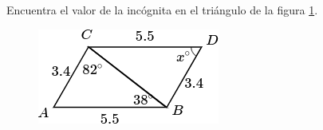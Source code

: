 Encuentra el valor de la incógnita en el triángulo de la figura \ref{fig:angle_triangle_23}.

\begin{minipage}[t][5cm][b]{0.3\textwidth}
    \begin{figure}[H]
        \centering
        \includegraphics[width=0.9\linewidth]{../images/angle_triangle_23.png}
        \caption{}
        \label{fig:angle_triangle_23}
    \end{figure}
\end{minipage}\hfill
\begin{minipage}[t]{0.65\textwidth}
    \begin{solutionbox}{5cm}

    \end{solutionbox}
\end{minipage}
